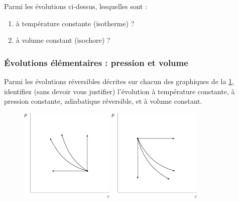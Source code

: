 	Parmi les évolutions ci-dessus, lesquelles sont :
	\begin{enumerate}
		\item à température constante (isotherme) ?
		\item à volume constant (isochore) ?
	\end{enumerate}


\subsubsection{Évolutions élémentaires : pression et volume}
\label{exo_retrouver_pv}

	Parmi les évolutions réversibles décrites sur chacun des graphiques de la \cref{fig_pvel}, identifiez (sans devoir vous justifier) l’évolution à température constante, à pression constante, adiabatique réversible, et à volume constant.
	
	\begin{figure}[!bh]
		\begin{center}
			\includegraphics[width=0.4\textwidth, max width=0.6\columnwidth]{images/exo_pv_elementaires1.png}
			\includegraphics[width=0.4\textwidth, max width=0.6\columnwidth]{images/exo_pv_elementaires2.png}
		\end{center}
		\label{fig_pvel}
	\end{figure}
	

